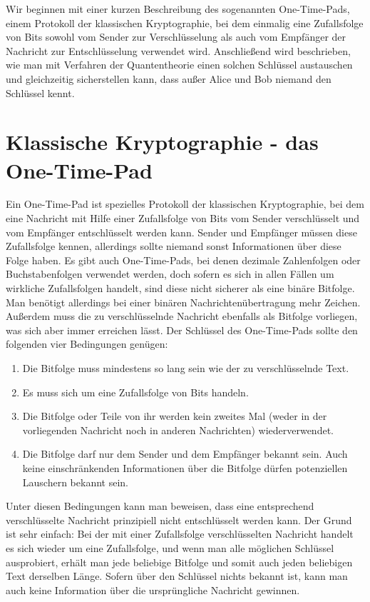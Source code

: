 Wir beginnen mit einer kurzen Beschreibung des sogenannten One-Time-Pads, einem
Protokoll der klassischen Kryptographie, bei dem einmalig eine Zufallsfolge von
Bits sowohl vom Sender zur Verschl\"usselung als auch vom Empf\"anger der Nachricht zur
Entschl\"usselung verwendet wird. Anschlie\ss end wird beschrieben, wie man mit 
Verfahren der Quantentheorie einen solchen Schl\"ussel austauschen und gleichzeitig sicherstellen kann,
dass au\ss er Alice und Bob niemand den Schl\"ussel kennt.

\section{Klassische Kryptographie - das One-Time-Pad}

Ein One-Time-Pad ist spezielles Protokoll der klassischen Kryptographie, bei dem eine Nachricht
mit Hilfe einer Zufallsfolge von Bits vom Sender verschl\"usselt und vom Empf\"anger entschl\"usselt
werden kann. Sender und Empf\"anger m\"ussen diese Zufallsfolge kennen,
allerdings sollte niemand sonst Informationen \"uber diese Folge haben. Es gibt auch One-Time-Pads, bei denen dezimale 
Zahlenfolgen oder Buchstabenfolgen verwendet werden, doch sofern es
sich in allen F\"allen um wirkliche Zufallsfolgen handelt, sind
diese nicht sicherer als eine bin\"are Bitfolge. Man ben\"otigt allerdings bei
einer bin\"aren Nachrichten\"ubertragung mehr Zeichen. Au\ss erdem muss die zu verschl\"usselnde Nachricht
ebenfalls als Bitfolge vorliegen, was sich aber immer erreichen l\"asst. 
Der Schl\"ussel des One-Time-Pads sollte den folgenden vier Bedingungen
gen\"ugen:
\begin{enumerate}
\item
Die Bitfolge muss mindestens so lang sein wie der zu verschl\"usselnde Text.
\item
Es muss sich um eine Zufallsfolge von Bits handeln.
\item
Die Bitfolge oder Teile von ihr werden kein zweites Mal (weder in der vorliegenden Nachricht
noch in anderen Nachrichten) wiederverwendet. 
\item
Die Bitfolge darf nur dem Sender und dem Empf\"anger bekannt sein. Auch keine einschr\"ankenden 
Informationen \"uber die Bitfolge d\"urfen potenziellen Lauschern bekannt sein.
\end{enumerate}
Unter diesen Bedingungen kann man beweisen, dass eine entsprechend verschl\"usselte Nachricht
prinzipiell nicht entschl\"usselt werden kann. Der Grund ist
sehr einfach: Bei der mit einer Zufallsfolge verschl\"usselten Nachricht handelt es sich wieder
um eine Zufallsfolge, und wenn man alle m\"oglichen Schl\"ussel ausprobiert, erh\"alt man jede beliebige
Bitfolge und somit auch jeden beliebigen Text derselben L\"ange. Sofern \"uber den Schl\"ussel nichts
bekannt ist, kann man auch keine Information \"uber die urspr\"ungliche Nachricht gewinnen.   

